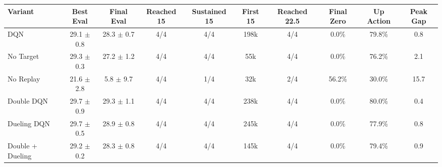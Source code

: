 \begin{adjustbox}{width=\textwidth}
\begin{tabular}{@{}lccccccccc@{}}
\toprule
\textbf{Variant} & \textbf{Best Eval} & \textbf{Final Eval} & \textbf{Reached 15} & \textbf{Sustained 15} & \textbf{First 15} & \textbf{Reached 22.5} & \textbf{Final Zero} & \textbf{Up Action} & \textbf{Peak Gap} \\
\midrule
DQN & 29.1 $\pm$ 0.8 & 28.3 $\pm$ 0.7 & 4/4 & 4/4 & 198k & 4/4 & 0.0\% & 79.8\% & 0.8 \\
No Target & 29.3 $\pm$ 0.3 & 27.2 $\pm$ 1.2 & 4/4 & 4/4 & 55k & 4/4 & 0.0\% & 76.2\% & 2.1 \\
No Replay & 21.6 $\pm$ 2.8 & 5.8 $\pm$ 9.7 & 4/4 & 1/4 & 32k & 2/4 & 56.2\% & 30.0\% & 15.7 \\
Double DQN & 29.7 $\pm$ 0.9 & 29.3 $\pm$ 1.1 & 4/4 & 4/4 & 238k & 4/4 & 0.0\% & 80.0\% & 0.4 \\
Dueling DQN & 29.7 $\pm$ 0.5 & 28.9 $\pm$ 0.8 & 4/4 & 4/4 & 245k & 4/4 & 0.0\% & 77.9\% & 0.8 \\
Double + Dueling & 29.2 $\pm$ 0.2 & 28.3 $\pm$ 0.8 & 4/4 & 4/4 & 145k & 4/4 & 0.0\% & 79.4\% & 0.9 \\
\bottomrule
\end{tabular}
\end{adjustbox}
